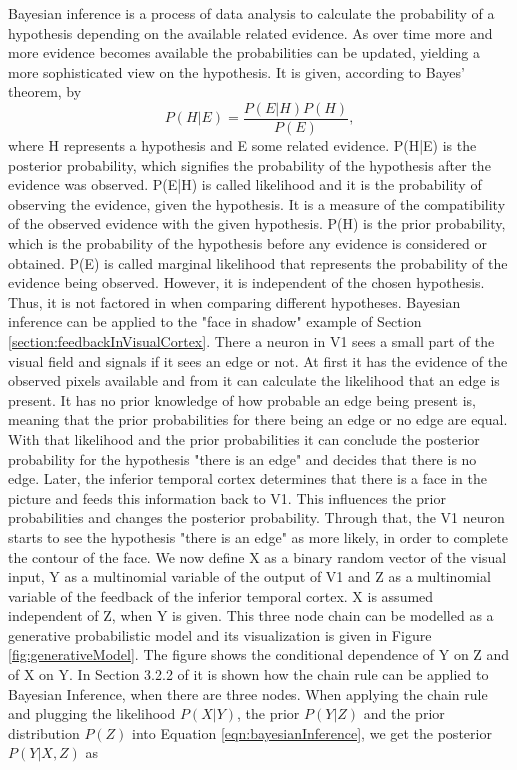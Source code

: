 Bayesian inference is a process of data analysis to calculate the probability of a hypothesis depending on the available related evidence. As over time more and more evidence becomes available the probabilities can be updated, yielding a more sophisticated view on the hypothesis. It is given, according to Bayes' theorem, by
\begin{equation}
\label{eqn:bayesianInference}
P(H|E) = \frac{P(E|H)P(H)}{P(E)},
\end{equation}
where H represents a hypothesis and E some related evidence. P(H|E) is the posterior probability, which signifies the probability of the hypothesis after the evidence was observed. P(E|H) is called likelihood and it is the probability of observing the evidence, given the hypothesis. It is a measure of the compatibility of the observed evidence with the given hypothesis. P(H) is the prior probability, which is the probability of the hypothesis before any evidence is considered or obtained. P(E) is called marginal likelihood that represents the probability of the evidence being observed. However, it is independent of the chosen hypothesis. Thus, it is not factored in when comparing different hypotheses.
Bayesian inference can be applied to the "face in shadow" example of Section \ref{section:feedbackInVisualCortex}. There a neuron in V1 sees a small part of the visual field and signals if it sees an edge or not. At first it has the evidence of the observed pixels available and from it can calculate the likelihood that an edge is present. It has no prior knowledge of how probable an edge being present is, meaning that the prior probabilities for there being an edge or no edge are equal. With that likelihood and the prior probabilities it can conclude the posterior probability for the hypothesis "there is an edge" and decides that there is no edge.
Later, the inferior temporal cortex determines that there is a face in the picture and feeds this information back to V1. This influences the prior probabilities and changes the posterior probability. Through that, the V1 neuron starts to see the hypothesis  "there is an edge" as more likely, in order to complete the contour of the face. 
We now define X as a binary random vector of the visual input, Y as a multinomial variable of the output of V1 and Z as a multinomial variable of the feedback of the inferior temporal cortex. X is assumed independent of Z, when Y is given. This three node chain can be modelled as a generative probabilistic model and its visualization is given in Figure \ref{fig:generativeModel}. The figure shows the conditional dependence of Y on Z and of X on Y. In Section 3.2.2 of \citet{bayesInferenceBook} it is shown how the chain rule can be applied to Bayesian Inference, when there are three nodes. When applying the chain rule and plugging the likelihood $P(X|Y)$, the prior $P(Y|Z)$ and the prior distribution $P(Z)$ into Equation \ref{eqn:bayesianInference}, we get the posterior $P(Y|X,Z)$ as
